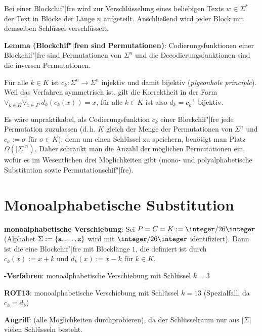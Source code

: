 Bei einer Blockchif"|fre wird zur Verschlüsselung eines beliebigen Texts $w \in \Sigma^\ast$ der
Text in Blöcke der Länge $n$ aufgeteilt.
Anschließend wird jeder Block mit demselben Schlüssel verschlüsselt.

\linie

\textbf{Lemma (Blockchif"|fren sind Permutationen)}:
Codierungsfunktionen einer Blockchif"|fre sind Permutationen von $\Sigma^n$
und die Decodierungsfunktionen sind die inversen Permutationen.

\begin{Beweis}
    Für alle $k \in K$ ist $c_k\colon \Sigma^n \rightarrow \Sigma^n$
    injektiv und damit bijektiv (\emph{pigeonhole principle}).
    Weil das Verfahren symmetrisch ist, gilt die Korrektheit in der Form
    $\forall_{k \in K} \forall_{x \in P}\; d_k(c_k(x)) = x$, für
    alle $k \in K$ ist also $d_k = c_k^{-1}$ bijektiv.
\end{Beweis}

Es wäre unpraktikabel, als Codierungsfunktion $c_k$ einer Blockchif"|fre jede Permutation
zuzulassen (d.\,h. $K$ gleich der Menge der Permutationen von $\Sigma^n$ und
$c_\sigma := \sigma$ für $\sigma \in K$),
denn um einen Schlüssel zu speichern, benötigt man Platz $\Omega(|\Sigma|^n)$.
Daher schränkt man die Anzahl der möglichen Permutationen ein,
wofür es im Wesentlichen drei Möglichkeiten gibt
(mono- und polyalphabetische Substitution sowie Permutationschif"|fre).

\section{%
    Monoalphabetische Substitution%
}

\textbf{monoalphabetische Verschiebung}:
Sei $P = C = K := \integer/26\integer$ (Alphabet $\Sigma := \{\texttt{a}, \dotsc, \texttt{z}\}$
wird mit $\integer/26\integer$ identifiziert).
Dann ist die  eine Blockchif"|fre mit Blocklänge $1$,
die definiert ist durch $c_k(x) := x + k$ und $d_k(x) := x - k$ für $k \in K$.

\textbf{-Verfahren}:
monoalphabetische Verschiebung mit Schlüssel $k = 3$

\textbf{ROT13}:
monoalphabetische Verschiebung mit Schlüssel $k = 13$ (Spezialfall, da $c_k = d_k$)

\textbf{Angriff}:
 (alle Möglichkeiten durchprobieren),
da der Schlüsselraum nur aus $|\Sigma|$ vielen Schlüsseln besteht.

